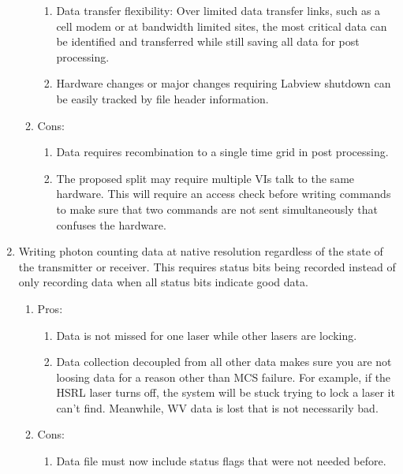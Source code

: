 \begin{enumerate}
\begin{enumerate}
{\begin{enumerate}
				\item{Data transfer flexibility: Over limited data transfer links, such as a cell modem or at bandwidth limited sites, the most critical data can be identified and transferred while still saving all data for post processing.}
				\item{Hardware changes or major changes requiring Labview shutdown can be easily tracked by file header information.}
			\end{enumerate}
		}
		\item{Cons:
			\begin{enumerate}
				\item{Data requires recombination to a single time grid in post processing.}
				\item{The proposed split may require multiple VIs talk to the same hardware. This will require an access check before writing commands to make sure that two commands are not sent simultaneously that confuses the hardware.}
			\end{enumerate}
		}
	\end{enumerate}
\item{Writing photon counting data at native resolution regardless of the state of the transmitter or receiver. This requires status bits being recorded instead of only recording data when all status bits indicate good data.}
	\begin{enumerate}
		\item{Pros:
			\begin{enumerate}
				\item{Data is not missed for one laser while other lasers are locking.}
				\item{Data collection decoupled from all other data makes sure you are not loosing data for a reason other than MCS failure. For example, if the HSRL laser turns off, the system will be stuck trying to lock a laser it can't find. Meanwhile, WV data is lost that is not necessarily bad. }
			\end{enumerate}
		}
		\item{Cons:
			\begin{enumerate}
				\item{Data file must now include status flags that were not needed before.}
			\end{enumerate}
		}
	\end{enumerate}
\end{enumerate}


